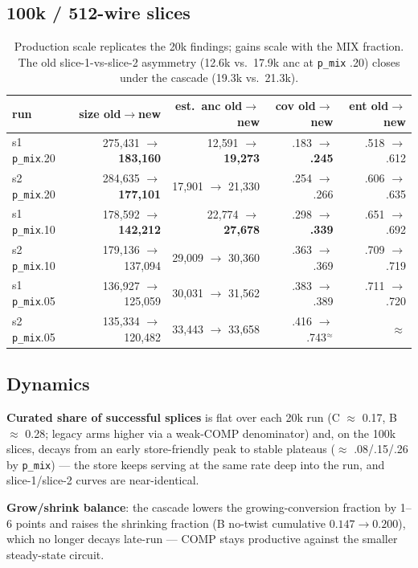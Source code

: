 \documentclass[11pt]{article}
\newcommand{\code}[1]{\texttt{#1}}
\begin{document}
\subsection{100k / 512-wire slices}

\begin{table}[h]\centering\small
\begin{tabular}{lrrrr}
\toprule
run & size old$\to$new & est.\ anc old$\to$new & cov old$\to$new & ent old$\to$new \\
\midrule
s1 \code{p\_mix}.20 & 275{,}431 $\to$ \textbf{183{,}160} & 12{,}591 $\to$ \textbf{19{,}273} & .183 $\to$ \textbf{.245} & .518 $\to$ .612 \\
s2 \code{p\_mix}.20 & 284{,}635 $\to$ \textbf{177{,}101} & 17{,}901 $\to$ 21{,}330 & .254 $\to$ .266 & .606 $\to$ .635 \\
s1 \code{p\_mix}.10 & 178{,}592 $\to$ \textbf{142{,}212} & 22{,}774 $\to$ \textbf{27{,}678} & .298 $\to$ \textbf{.339} & .651 $\to$ .692 \\
s2 \code{p\_mix}.10 & 179{,}136 $\to$ 137{,}094 & 29{,}009 $\to$ 30{,}360 & .363 $\to$ .369 & .709 $\to$ .719 \\
s1 \code{p\_mix}.05 & 136{,}927 $\to$ 125{,}059 & 30{,}031 $\to$ 31{,}562 & .383 $\to$ .389 & .711 $\to$ .720 \\
s2 \code{p\_mix}.05 & 135{,}334 $\to$ 120{,}482 & 33{,}443 $\to$ 33{,}658 & .416 $\to$ .743$^{\approx}$ & $\approx$ \\
\bottomrule
\end{tabular}
\caption{Production scale replicates the 20k findings; gains scale with the
MIX fraction. The old slice-1-vs-slice-2 asymmetry (12.6k vs.\ 17.9k anc at
\code{p\_mix} .20) closes under the cascade (19.3k vs.\ 21.3k).}
\end{table}

\subsection{Dynamics}

\textbf{Curated share of successful splices} is flat over each 20k run
(C $\approx$ 0.17, B $\approx$ 0.28; legacy arms higher via a weak-COMP
denominator) and, on the 100k slices, decays from an early store-friendly
peak to stable plateaus ($\approx$ .08/.15/.26 by \code{p\_mix}) --- the
store keeps serving at the same rate deep into the run, and slice-1/slice-2
curves are near-identical.

\textbf{Grow/shrink balance}: the cascade lowers the growing-conversion
fraction by 1--6 points and raises the shrinking fraction (B no-twist
cumulative $0.147 \to 0.200$), which no longer decays late-run --- COMP
stays productive against the smaller steady-state circuit.
\end{document}
